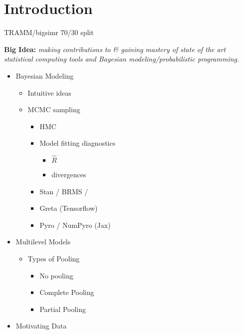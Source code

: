 \documentclass[
]{article}
\providecommand{\tightlist}{%
  \setlength{\itemsep}{0pt}\setlength{\parskip}{0pt}}
\begin{document}
\hypertarget{introduction}{%
\section*{Introduction}\label{introduction}}


TRAMM/bigsimr 70/30 split

\textbf{Big Idea:} \emph{making contributions to \& gaining mastery of state of the art statistical computing tools and Bayesian modeling/probabilistic programming.}

\begin{itemize}
\tightlist
\item
  Bayesian Modeling

  \begin{itemize}
  \tightlist
  \item
    Intuitive ideas
  \item
    MCMC sampling

    \begin{itemize}
    \tightlist
    \item
      HMC
    \item
      Model fitting diagnostics

      \begin{itemize}
      \tightlist
      \item
        \(\hat{R}\)
      \item
        divergences
      \end{itemize}
    \item
      Stan / BRMS /
    \item
      Greta (Tensorflow)
    \item
      Pyro / NumPyro (Jax)
    \end{itemize}
  \end{itemize}
\item
  Multilevel Models

  \begin{itemize}
  \tightlist
  \item
    Types of Pooling

    \begin{itemize}
    \tightlist
    \item
      No pooling
    \item
      Complete Pooling
    \item
      Partial Pooling
    \end{itemize}
  \end{itemize}
\item
  Motivating Data


\end{itemize}
\end{document}
